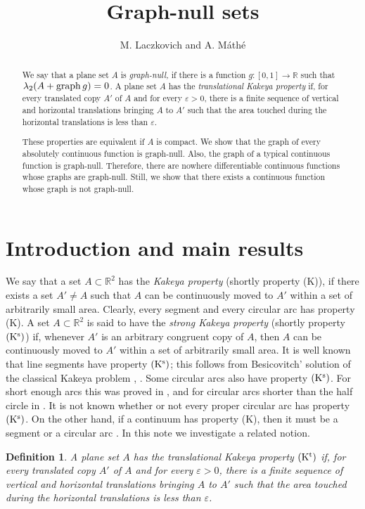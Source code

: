 \documentclass[12pt]{article}
\newtheorem{defin}[theorem]{Definition}
\def\rr{{\mathbb R}}
\def\sik{{\rr}^2}
\def\su{\subset}
\def\ep{\varepsilon}
\def\la{\lambda}
\def\nl{[0,1]}
\def\graph{{\rm graph}\, }
\begin{document}
\title{Graph-null sets}
\author{M. Laczkovich and A. M\'ath\'e}


\maketitle


\begin{abstract}
We say that a plane set $A$ is {\it graph-null,} if there is a function 
$g\colon \nl \to \rr$ such that $\la _2 (A+\graph g)=0$. A plane set $A$ has
the {\it translational Kakeya property} if, for every translated copy $A'$
of $A$ and for every $\ep >0$, there is a finite sequence of vertical
and horizontal translations bringing $A$ to $A'$ such that the area touched
during the horizontal translations is less than $\ep$.

These properties are equivalent if $A$ is compact. We show that 
the graph of every absolutely continuous function is graph-null. Also, the graph
of a typical continuous function is graph-null. Therefore, there are nowhere
differentiable continuous functions whose graphs are graph-null. Still,
we show that there exists a continuous function whose graph is not graph-null.
\end{abstract}

\section{Introduction and main results}\label{s1}

We say that a set $A\su \sik$ has the
{\it Kakeya property} (shortly property (K)), if there exists a set $A'\ne A$
such that $A$ can be continuously moved to $A'$ within a set of
arbitrarily small area. Clearly, every segment and every circular arc has
property (K). A set $A\su \sik$ is said to have the {\it strong Kakeya
property} (shortly property ${\rm (K^s )}$) if, whenever $A'$ is an arbitrary
congruent copy of $A$, then $A$ can be continuously moved to $A'$ within a set
of arbitrarily small area. It is well known that line segments have 
property ${\rm (K^s )}$; this follows from Besicovitch' solution of
the classical Kakeya problem \cite{B}, \cite[Theorem 7.6]{F}. Some circular
arcs also have  property ${\rm (K^s )}$. For short enough arcs this was proved
in \cite{HK}, and for circular arcs shorter than the half circle in \cite{CC}.
It is not known whether or not every proper circular arc has property
${\rm (K^s )}$. On the other hand, if a continuum has property (K), then it
must be a segment or a circular arc \cite{CHL}.
In this note we investigate a related notion.
\begin{defin} {\rm A plane set $A$ has the} translational Kakeya property
${\rm (K^t)}$ {\rm if, for every translated copy $A'$ of $A$ and for every
$\ep >0$, there is a finite sequence of vertical and horizontal translations
bringing $A$ to $A'$ such that the area touched during the} horizontal {\rm
translations is less than $\ep$.}
\end{defin}
\end{document}
